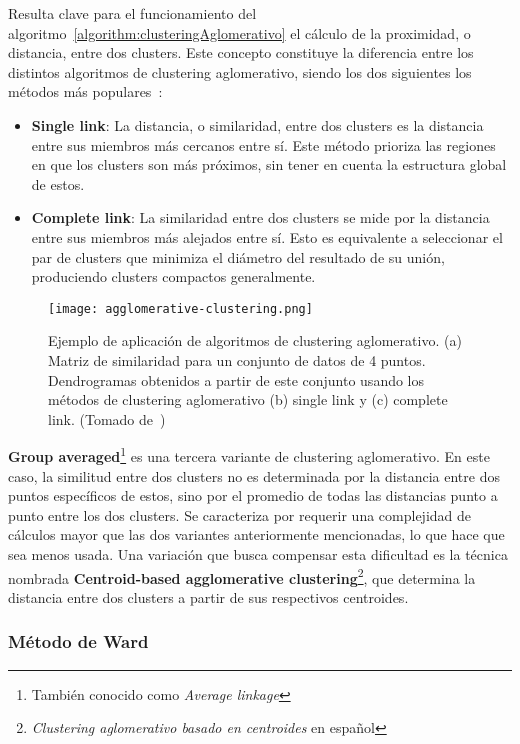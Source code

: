 Resulta clave para el funcionamiento del algoritmo~\ref{algorithm:clusteringAglomerativo} el cálculo de la proximidad, o distancia, entre dos clusters.
Este concepto constituye la diferencia entre los distintos algoritmos de clustering aglomerativo, siendo los dos siguientes los métodos más populares~\cite{Aggarawal13}:

\begin{itemize}
    \item \textbf{Single link}: La distancia, o similaridad, entre dos clusters es la distancia entre sus miembros más cercanos entre sí.
    Este método prioriza las regiones en que los clusters son más próximos, sin tener en cuenta la estructura global de estos.
    \item \textbf{Complete link}: La similaridad entre dos clusters se mide por la distancia entre sus miembros más alejados entre sí.
    Esto es equivalente a seleccionar el par de clusters que minimiza el diámetro del resultado de su unión, produciendo clusters compactos generalmente.
\end{itemize}

\begin{figure}[!h]
    \centering
    \texttt{[image: agglomerative-clustering.png]}
    \caption{Ejemplo de aplicación de algoritmos de clustering aglomerativo. (a) Matriz de similaridad para un conjunto de datos de 4 puntos.
    Dendrogramas obtenidos a partir de este conjunto usando los métodos de clustering aglomerativo (b) single link y (c) complete link. (Tomado de~\cite{Aggarawal13})}
\end{figure}

\textbf{Group averaged}\footnote{También conocido como \textit{Average linkage}} es una tercera variante de clustering aglomerativo.
En este caso, la similitud entre dos clusters no es determinada por la distancia entre dos puntos específicos de estos, sino por el promedio de todas las distancias punto a punto entre los dos clusters.
Se caracteriza por requerir una complejidad de cálculos mayor que las dos variantes anteriormente mencionadas, lo que hace que sea menos usada.
Una variación que busca compensar esta dificultad es la técnica nombrada \textbf{Centroid-based agglomerative clustering}\footnote{\textit{Clustering aglomerativo basado en centroides} en español}, que determina la distancia entre dos clusters a partir de sus respectivos centroides.

\subsubsection{Método de Ward}

